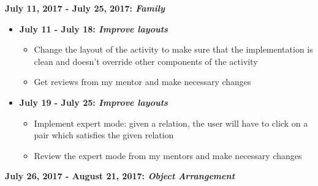 \documentclass[preprint,12pt]{elsarticle}
\begin{document}
\textbf{July 11, 2017 - July 25, 2017: \textit{Family}}
\begin{itemize}

\item \textbf{July 11 - July 18: \textit{Improve layouts}}
\begin{itemize}
\item Change the layout of the activity to make sure that the implementation is clean and doesn't override other components of the activity
\item Get reviews from my mentor and make necessary changes
\end{itemize}

\item \textbf{July 19 - July 25: \textit{Improve layouts}}
\begin{itemize}
\item Implement expert mode: given a relation, the user will have to click on a pair which satisfies the given relation
\item Review the expert mode from my mentors and make necessary changes
\end{itemize}

\end{itemize}

\textbf{July 26, 2017 - August 21, 2017: \textit{Object Arrangement}}
\end{document}
